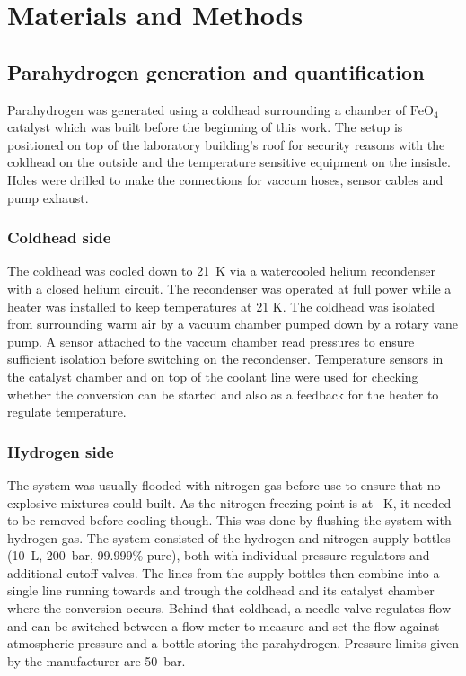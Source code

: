 \chapter{Materials and Methods}\label{chap:MaterialsAndMethods}
    \section{Parahydrogen generation and quantification}
    Parahydrogen was generated using a coldhead surrounding a chamber of $\mathrm{FeO_4}$ catalyst which was built before the beginning of this work. The setup is positioned on top of the laboratory building's roof for security reasons with the coldhead on the outside and the temperature sensitive equipment on the insisde. Holes were drilled to make the connections for vaccum hoses, sensor cables and pump exhaust.
        \subsection{Coldhead side}
            The coldhead was cooled down to \SI{21}{\kelvin} via a watercooled helium recondenser with a closed helium circuit. The recondenser was operated at full power while a heater was installed to keep temperatures at 21 K. The coldhead was isolated from surrounding warm air by a vacuum chamber pumped down by a rotary vane pump. A sensor attached to the vaccum chamber read pressures to ensure sufficient isolation before switching on the recondenser. Temperature sensors in the catalyst chamber and on top of the coolant line were used for checking whether the conversion can be started and also as a feedback for the heater to regulate temperature.
        \subsection{Hydrogen side}
            The system was usually flooded with nitrogen gas before use to ensure that no explosive mixtures could built. As the nitrogen freezing point is at \SI{}{\kelvin}, it needed to be removed before cooling though. This was done by flushing the system with hydrogen gas. The system consisted of the hydrogen and nitrogen supply bottles (\SI{10}{\liter}, \SI{200}{\bar}, 99.999\% pure), both with individual pressure regulators and additional cutoff valves. The lines from the supply bottles then combine into a single line running towards and trough the coldhead and its catalyst chamber where the conversion occurs. Behind that coldhead, a needle valve regulates flow and can be switched between a flow meter to measure and set the flow against atmospheric pressure and a bottle storing the parahydrogen. Pressure limits given by the manufacturer are \SI{50}{\bar}. 
